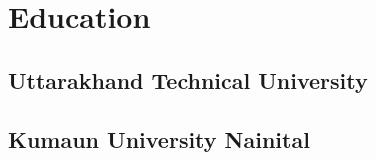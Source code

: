 \documentclass[]{resume}
\begin{document}
\begin{minipage}[t]{0.66\textwidth}
        \section{Education}\label{sec:education}
        \subsection{Uttarakhand Technical University}\label{subsec:uttarakhand-technical-university}

        \subsection{Kumaun University Nainital}\label{subsec:kumaun-university-nainital}

        \sectionsep

    \end{minipage}
\end{document}
